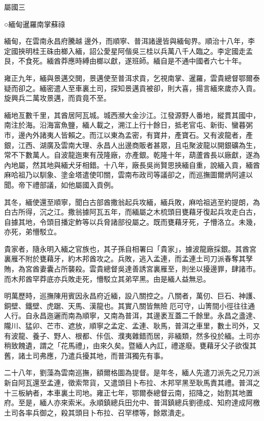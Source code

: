 
\begin{pinyinscope}
屬國三

○緬甸暹羅南掌蘇祿

緬甸，在雲南永昌府騰越邊外，而順寧、普洱諸邊皆與緬甸界。順治十八年，李定國挾明桂王硃由榔入緬，詔公愛星阿偕吳三桂以兵萬八千人臨之。李定國走孟艮，不食死。緬酋莽應時縛由榔以獻，遂班師。緬自是不通中國者六七十年。

雍正九年，緬與景邁交閧，景邁使至普洱求貢，乞視南掌、暹羅，雲貴總督鄂爾泰疑而卻之。緬密遣人至車裏土司，探知景邁貢被卻，則大喜，揚言緬來歲亦入貢。旋興兵二萬攻景邁，而貢竟不至。

緬地亙數千里，其酋居阿瓦城。城西瀕大金沙江。江發源野人番地，縱貫其國中，南注於海。沿海富魚鹽，緬人載之，溯江上行十餘日，抵老官屯、新街、蠻暮粥市，邊內外諸夷人皆賴之。而江以東為孟密，有寶井，產寶石。又有波龍者，產銀，江西、湖廣及雲南大理、永昌人出邊商販者甚眾，且屯聚波龍以開銀礦為生，常不下數萬人。自波龍迤東有茂隆廠，亦產銀。乾隆十年，葫蘆酋長以廠獻，遂為內地屬，然其地與緬犬牙相錯。十八年，廠長吳尚賢思挾緬自重，說緬入貢，緬酋麻哈祖乃以馴象、塗金塔遣使叩關，雲南布政司等議卻之，而巡撫圖爾炳阿遽以聞。帝下禮部議，如他屬國入貢例。

其冬，緬使還至順寧，聞白古部酋撒翁起兵攻緬，緬兵敗，麻哈祖逃至約提朗，為白古所得，沉之江。撒翁據阿瓦五年，而緬屬之木梳頭目甕藉牙復起兵攻走白古，自據其地，令頭目播定鮓等以兵脅諸部役屬之。既而甕藉牙死，子懵洛立。未幾，亦死，弟懵駁立。

貴家者，隨永明入緬之官族也，其子孫自相署曰「貴家」，據波龍廠採銀。其酋宮裏雁不附於甕藉牙，約木邦酋攻之。兵敗，逃入孟連，而孟連土司刀派春奪其孥賄，為宮酋妻囊占所襲殺。雲貴總督吳達善誘宮裏雁至，則坐以擾邊罪，肆諸市。而木邦酋罕莽底亦兵敗走死，懵駁立其弟罕黑。由是緬人益無忌。

明萬歷時，巡撫陳用賓因永昌府近緬，設八關控之。八關者，萬仞、巨石、神護、銅壁、鐵壁、虎踞、天馬、漢龍也。其實八關皆無險厄可守，山箐間小徑往往通人行。自永昌迤邐而南為順寧，又南為普洱，其邊袤亙蓋二千餘里。永昌之盞達、隴川、猛卯、芒市、遮放，順寧之孟定、孟連、耿馬，普洱之車里，數土司外，又有波龍、養子、野人、根都、佧佤、濮夷雜錯而居，非緬類，然多役於緬。土司亦稍致餽遺，謂之「花馬禮」，由來久矣。暨緬人內訌，禮遂廢。甕藉牙父子欲復其舊，諸土司弗應，乃遣兵擾其地，而普洱獨先有事。

二十八年，劉藻為雲南巡撫，額爾格圖為提督。是年冬，緬人先遣刀派先之兄刀派新自阿瓦還至孟連，徵索幣貨，又遣頭目卜布拉、木邦罕黑至耿馬責其禮。普洱之十三板納者，本車裏土司地。雍正七年，鄂爾泰總督云南，招降之，始割其地置府。至是，緬人亦來索米。永順鎮總兵田允中、普洱鎮總兵劉德成、知府達成阿檄土司各率兵御之，殺其頭目卜布拉、召罕標等，餘眾潰走。


\end{pinyinscope}
